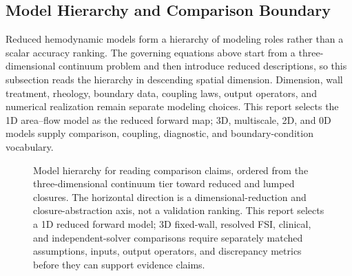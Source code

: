 \subsection{Model Hierarchy and Comparison Boundary}
\label{subsec:model-hierarchy-comparison-boundary}

Reduced hemodynamic models form a hierarchy of modeling roles rather than a
scalar accuracy ranking. The governing equations above start from a
three-dimensional continuum problem and then introduce reduced descriptions, so
this subsection reads the hierarchy in descending spatial dimension. Dimension,
wall treatment, rheology, boundary data, coupling laws, output operators, and
numerical realization remain separate modeling choices. This report selects the
1D area--flow model as the reduced forward map; 3D, multiscale, 2D, and 0D
models supply comparison, coupling, diagnostic, and boundary-condition
vocabulary.

\begin{figure}[!htb]
    \centering
    \captionsetup{aboveskip=2pt,belowskip=2pt}
    \caption{Model hierarchy for reading comparison claims, ordered from the
    three-dimensional continuum tier toward reduced and lumped closures. The
    horizontal direction is a dimensional-reduction and closure-abstraction
    axis, not a validation ranking. This report selects a 1D reduced forward
    model; 3D fixed-wall, resolved FSI, clinical, and independent-solver
    comparisons require separately matched assumptions, inputs, output
    operators, and discrepancy metrics before they can support evidence claims.}
    \label{fig:model-hierarchy-overview}
\end{figure}

